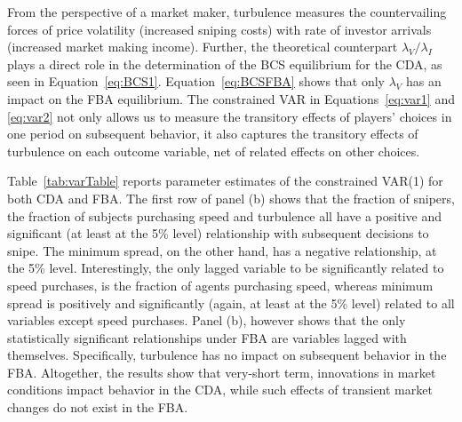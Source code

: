 \documentclass[12pt]{article}
\begin{document}
From the perspective of a market maker, turbulence measures the countervailing forces of price volatility (increased sniping costs) with rate of investor arrivals (increased market making income). Further, the theoretical counterpart $\lambda_V/\lambda_{I}$ plays a direct role in the determination of the BCS equilibrium for the CDA, as seen in Equation~\eqref{eq:BCS1}. Equation~\eqref{eq:BCSFBA} shows that only $\lambda_V$ has an impact on the FBA equilibrium. The constrained VAR in Equations~\eqref{eq:var1} and \eqref{eq:var2} not only allows us to measure the transitory effects of players' choices in one period on subsequent behavior, it also captures the transitory effects of turbulence on each outcome variable, net of related effects on other choices.

Table~\ref{tab:varTable} reports parameter estimates of the constrained VAR(1) for both CDA and FBA. The first row of panel (b) shows that the fraction of snipers, the fraction of subjects purchasing speed and turbulence all have a positive and significant (at least at the 5\% level) relationship with subsequent decisions to snipe. The minimum spread, on the other hand, has a negative relationship, at the 5\% level. 
Interestingly, the only lagged variable to be significantly related to speed purchases, is the fraction of agents purchasing speed, whereas minimum spread is positively and significantly (again, at least at the 5\% level) related to all variables except speed purchases. Panel (b), however shows that the only statistically significant relationships under FBA are variables lagged with themselves. Specifically, turbulence has no impact on subsequent behavior in the FBA. Altogether, the results show that very-short term, innovations in market conditions impact behavior in the CDA, while such effects of transient market changes do not exist in the FBA.
\end{document}
